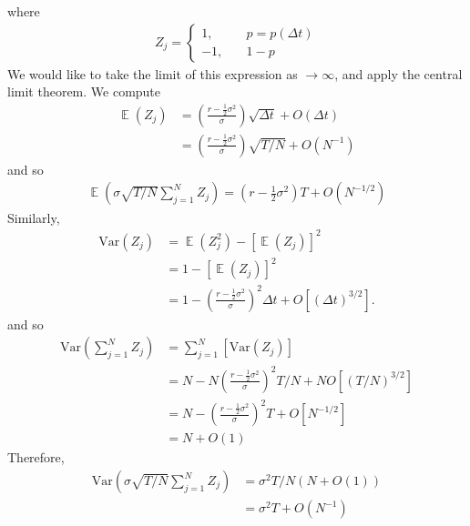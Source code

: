 \documentclass[12pt]{article}
\DeclareMathOperator{\ex}{\mathbb{E}}
\newcommand{\var}{\mathrm{Var}}
\theoremstyle{plain}
\theoremstyle{definition}
\theoremstyle{remark}
\numberwithin{equation}{section}  %
\begin{document}
where
\begin{equation*}
\begin{split}
	Z_{j} = \begin{cases}
		1, \quad & p = p(\Delta t) \\
		-1, \quad & 1-p  
	\end{cases}
\end{split}
\end{equation*}
We would like to take the limit of this expression as $ \to \infty$,
and apply the central limit theorem. We compute
\begin{equation*}
\begin{split}
	\ex(Z_{j}) & = \left( \frac{r - \frac{1}{2} \sigma^{2}}{\sigma}
	\right)\sqrt{\Delta t}  + O(\Delta t)
	\\
	& = \left( \frac{r - \frac{1}{2} \sigma^{2}}{\sigma}
	\right)\sqrt{T/N}  + O(N^{-1})
\end{split}
\end{equation*}
and so 
\begin{equation*}
\begin{split}
	\ex\left( \sigma \sqrt{T/N} \sum_{j=1}^{N} Z_{j} \right)
	= (r - \frac{1}{2} \sigma^{2})T + O(N^{-1/2}) 
\end{split}
\end{equation*}
Similarly, 
\begin{equation*}
\begin{split}
	\var (Z_{j}) & = \ex(Z_{j}^2) - {[\ex(Z_{j})]}^{2} 
	\\
	& = 1 - {[\ex(Z_{j})]}^{2} 
	\\
	& = 1 - {\left( \frac{r - \frac{1}{2} \sigma^{2}}{\sigma}
\right)}^{2}
	\Delta t  + O[{(\Delta t)}^{3/2}].
\end{split}
\end{equation*}
and so
\begin{equation*}
\begin{split}
	\var(\sum_{j=1}^{N} Z_{j}) 
	& = \sum_{j=1}^{N}[\var(Z_{j})]
	\\
	& = N - N {\left( \frac{r - \frac{1}{2} \sigma^{2}}{\sigma}
\right)}^{2}
	T/N  + N O[{(T/N)}^{3/2}]
	\\
	& = N - {\left( \frac{r - \frac{1}{2} \sigma^{2}}{\sigma}
\right)}^{2}
	T  + O[N^{-1/2}]
	\\
	& = N + O(1)
	\end{split}
\end{equation*}
Therefore,
\begin{equation*}
\begin{split}
	\var(\sigma \sqrt{T/N} \sum_{j=1}^{N} Z_{j})
	& = \sigma^{2} T/N\left( N + O(1) \right)
	\\
	& = \sigma^{2} T + O(N^{-1})
\end{split}
\end{equation*}
\end{document}
